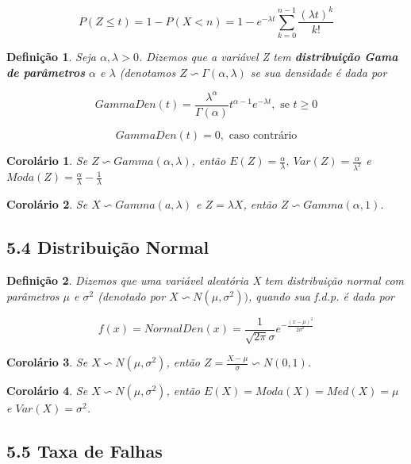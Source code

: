 \documentclass[12pt]{article}
\newtheorem{corollary}{Corolário}[theorem]
\newtheorem{definition}{Definição}
\begin{document}
$$P(Z \leq t) = 1 - P(X < n) = 1 - e^{- \lambda t} \sum_{k = 0}^{n-1} \frac{(\lambda t)^k}{k !}$$

\begin{definition}
    Seja $\alpha, \lambda > 0$. Dizemos que a variável Z tem \textbf{distribuição Gama de parâmetros} $\alpha$ e $\lambda$ (denotamos $Z \backsim \Gamma(\alpha, \lambda)$ se sua densidade é dada por
    
    $$GammaDen (t) = \frac{\lambda^\alpha}{\Gamma(\alpha)} t^{\alpha - 1}e^{- \lambda t}, \text{ se } t \geq 0$$
    
    $$GammaDen (t) = 0, \text{ caso contrário}$$
\end{definition}

\begin{corollary}
    Se $Z \backsim Gamma(\alpha, \lambda)$, então $E(Z) = \frac{\alpha}{\lambda}, \ Var(Z) = \frac{\alpha}{\lambda^2}$ e $Moda(Z) = \frac{\alpha}{\lambda} - \frac{1}{\lambda}$
\end{corollary}

\begin{corollary}
    Se $X \backsim Gamma(a, \lambda)$ e $Z = \lambda X$, então $Z \backsim Gamma(\alpha, 1)$.
\end{corollary}

\subsection*{5.4 Distribuição Normal}

\begin{definition}
    Dizemos que uma variável aleatória X tem distribuição normal com parâmetros $\mu$ e $\sigma^2$ (denotado por $X \backsim N(\mu, \sigma^2))$, quando sua f.d.p. é dada por 

    $$f(x) = NormalDen(x) = \frac{1}{\sqrt{2 \pi} \sigma} e^{- \frac{(x - \mu)^2}{2 \sigma^2}}$$
\end{definition}

\begin{corollary}
    Se $X \backsim N(\mu, \sigma^2)$, então $Z = \frac{X - \mu}{\sigma} \backsim N(0, 1)$.
\end{corollary}

\begin{corollary}
    Se $X \backsim N(\mu, \sigma^2)$, então $E(X) = Moda(X) = Med(X) = \mu$ e $Var(X) = \sigma^2$.
\end{corollary}

\subsection*{5.5 Taxa de Falhas}
\end{document}
